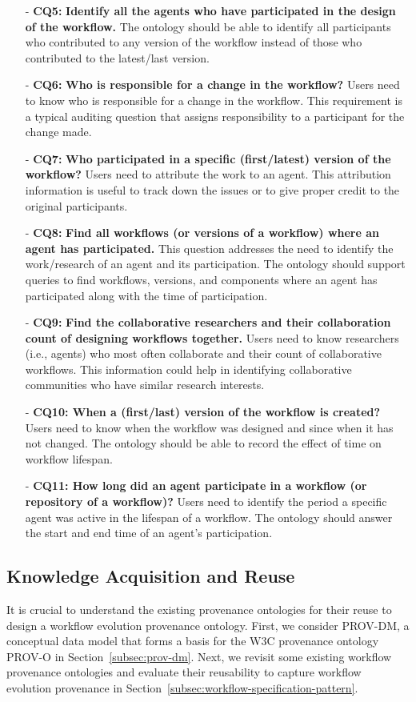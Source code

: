 \documentclass[ao]{iosart2x}
\begin{document}
\begin{enumerate}
    \item[-]\textbf{CQ5:} \textbf{Identify all the agents who have participated in the design of the workflow.} The ontology should be able to identify all participants who contributed to any version of the workflow instead of those who contributed to the latest/last version.
    \item[-]\textbf{CQ6:} \textbf{Who is responsible for a change in the workflow?} Users need to know who is responsible for a change in the workflow. This requirement is a typical auditing question that assigns responsibility to a participant for the change made.
    \item[-]\textbf{CQ7:} \textbf{Who participated in a specific (first/latest) version of the workflow?} Users need to attribute the work to an agent. This attribution information is useful to track down the issues or to give proper credit to the original participants. 
    \item[-]\textbf{CQ8:} \textbf{Find all workflows (or versions of a workflow) where an agent has participated.}  This question addresses the need to identify the work/research of an agent and its participation.  The ontology should support queries to find workflows, versions, and components where an agent has participated along with the time of participation.   
    \item[-]\textbf{CQ9:} \textbf{Find the collaborative researchers and their collaboration count of designing workflows together.} Users need to know researchers (i.e., agents) who most often collaborate and their count of collaborative workflows. This information could help in identifying collaborative communities who have similar research interests. 
    \item[-]\textbf{CQ10: When a (first/last) version of the workflow is created?}  Users need to know when the workflow was designed and since when it has not changed.  The ontology should be able to record the effect of time on workflow lifespan.
    \item[-]\textbf{CQ11: How long did an agent participate in a workflow (or repository of a workflow)?} Users need to identify the period a specific agent was active in the lifespan of a workflow. The ontology should answer the start and end time of an agent's participation. 
\end{enumerate}

\subsection{Knowledge Acquisition and Reuse}
It is crucial to understand the existing provenance ontologies for their reuse to design a workflow evolution provenance ontology. 
First, we consider PROV-DM, a conceptual data model that forms a basis for the W3C provenance ontology PROV-O in Section~\ref{subsec:prov-dm}. 
Next, we revisit some existing workflow provenance ontologies and evaluate their reusability to capture workflow evolution provenance in Section~\ref{subsec:workflow-specification-pattern}.
\end{document}
